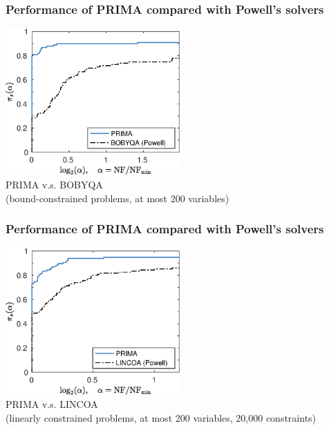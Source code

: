 \documentclass[slidestop,mathserif,xcolor=dvipsnames]{beamer}
\begin{document}

\begin{frame}
    \frametitle{Performance of PRIMA compared with Powell's solvers}
    \vspace{3ex}
    \begin{center}
    \includegraphics[width=0.5\textwidth]{prima_bobyqa.eps}
    \\[2ex]PRIMA v.s. BOBYQA \\[1ex](bound-constrained problems, at most 200 variables)
    \end{center}
\end{frame}

\begin{frame}
    \frametitle{Performance of PRIMA compared with Powell's solvers}
    \vspace{3ex}
    \begin{center}
    \includegraphics[width=0.5\textwidth]{prima_lincoa.eps}
    \\[2ex]PRIMA v.s. LINCOA \\[1ex](linearly constrained problems, at most 200 variables, 20,000 constraints)
    \end{center}
\end{frame}
\end{document}
